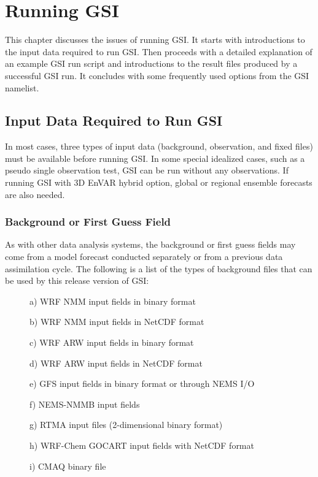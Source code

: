 \chapter{Running GSI}
\setlength{\parskip}{12pt}

This chapter discusses the issues of running GSI. It starts with introductions to the input data required to run GSI. Then proceeds with a detailed explanation of an example GSI run script and introductions to the result files produced by a successful GSI run. It concludes with some frequently used options from the GSI namelist.

\section{Input Data Required to Run GSI}
\label{sec3.1}

In most cases, three types of input data (background, observation, and fixed files) must be available before running GSI. In some special idealized cases, such as a pseudo single observation test, GSI can be run without any observations. If running GSI with 3D EnVAR hybrid option, global or regional ensemble forecasts are also needed.

\subsection{Background or First Guess Field}

As with other data analysis systems, the background or first guess fields may come from a model forecast conducted separately or from a previous data assimilation cycle. The following is a list of the types of background files that can be used by this release version of GSI:

\begin{small}
\begin{description}
\item[ ] a) WRF NMM input fields in binary format
\item[ ] b) WRF NMM input fields in NetCDF format
\item[ ] c) WRF ARW input fields in binary format
\item[ ] d) WRF ARW input fields in NetCDF format
\item[ ] e) GFS input fields in binary format or through NEMS I/O
\item[ ] f) NEMS-NMMB input fields
\item[ ] g) RTMA input files (2-dimensional binary format)
\item[ ] h) WRF-Chem GOCART input fields with NetCDF format
\item[ ] i) CMAQ binary file 
\end{description}
\end{small}

